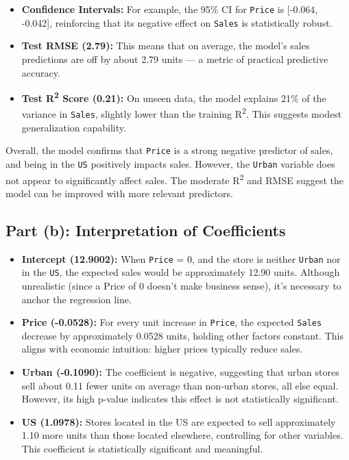 \documentclass[12pt]{article}
\begin{document}
\begin{itemize}
  \item \textbf{Confidence Intervals:} For example, the 95\% CI for \texttt{Price} is [-0.064, -0.042], reinforcing that its negative effect on \texttt{Sales} is statistically robust.

  \item \textbf{Test RMSE (2.79):} This means that on average, the model's sales predictions are off by about 2.79 units — a metric of practical predictive accuracy.

  \item \textbf{Test R\textsuperscript{2} Score (0.21):} On unseen data, the model explains 21\% of the variance in \texttt{Sales}, slightly lower than the training R\textsuperscript{2}. This suggests modest generalization capability.

\end{itemize}

\noindent
Overall, the model confirms that \texttt{Price} is a strong negative predictor of sales, and being in the \texttt{US} positively impacts sales. However, the \texttt{Urban} variable does not appear to significantly affect sales. The moderate R\textsuperscript{2} and RMSE suggest the model can be improved with more relevant predictors.

\subsection*{Part (b): Interpretation of Coefficients}

\begin{itemize}
  \item \textbf{Intercept (12.9002):} When \texttt{Price} = 0, and the store is neither \texttt{Urban} nor in the \texttt{US}, the expected sales would be approximately 12.90 units. Although unrealistic (since a Price of 0 doesn't make business sense), it's necessary to anchor the regression line.

  \item \textbf{Price (-0.0528):} For every unit increase in \texttt{Price}, the expected \texttt{Sales} decrease by approximately 0.0528 units, holding other factors constant. This aligns with economic intuition: higher prices typically reduce sales.

  \item \textbf{Urban (-0.1090):} The coefficient is negative, suggesting that urban stores sell about 0.11 fewer units on average than non-urban stores, all else equal. However, its high p-value indicates this effect is not statistically significant.

  \item \textbf{US (1.0978):} Stores located in the US are expected to sell approximately 1.10 more units than those located elsewhere, controlling for other variables. This coefficient is statistically significant and meaningful.
\end{itemize}
\end{document}
